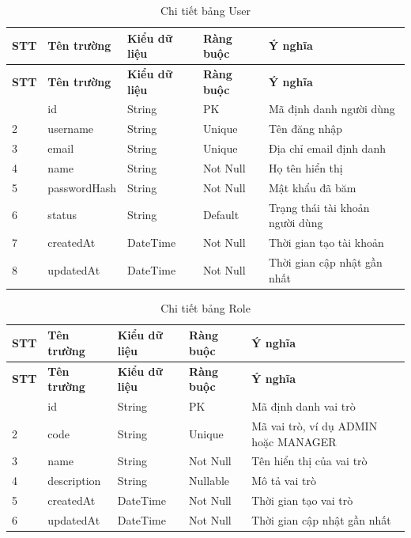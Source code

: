 \begin{longtable}{|p{0.7cm}|p{3.3cm}|p{1.9cm}|p{2.1cm}|p{5.4cm}|}
    \caption{Chi tiết bảng User}
    \label{tab:db_user} \\
    \hline
    \textbf{STT} & \textbf{Tên trường} & \textbf{Kiểu dữ liệu} & \textbf{Ràng buộc} & \textbf{Ý nghĩa} \\
    \hline
    \endfirsthead
    \hline
    \textbf{STT} & \textbf{Tên trường} & \textbf{Kiểu dữ liệu} & \textbf{Ràng buộc} & \textbf{Ý nghĩa} \\
    \hline
    \endhead
    \hline
    \endfoot
    \hline
    \endlastfoot
    1 & id & String & PK & Mã định danh người dùng \\ \hline
    2 & username & String & Unique & Tên đăng nhập \\ \hline
    3 & email & String & Unique & Địa chỉ email định danh \\ \hline
    4 & name & String & Not Null & Họ tên hiển thị \\ \hline
    5 & passwordHash & String & Not Null & Mật khẩu đã băm \\ \hline
    6 & status & String & Default & Trạng thái tài khoản người dùng \\ \hline
    7 & createdAt & DateTime & Not Null & Thời gian tạo tài khoản \\ \hline
    8 & updatedAt & DateTime & Not Null & Thời gian cập nhật gần nhất \\
\end{longtable}

\begin{longtable}{|p{0.7cm}|p{3.3cm}|p{1.9cm}|p{2.1cm}|p{5.4cm}|}
    \caption{Chi tiết bảng Role}
    \label{tab:db_role} \\
    \hline
    \textbf{STT} & \textbf{Tên trường} & \textbf{Kiểu dữ liệu} & \textbf{Ràng buộc} & \textbf{Ý nghĩa} \\
    \hline
    \endfirsthead
    \hline
    \textbf{STT} & \textbf{Tên trường} & \textbf{Kiểu dữ liệu} & \textbf{Ràng buộc} & \textbf{Ý nghĩa} \\
    \hline
    \endhead
    \hline
    \endfoot
    \hline
    \endlastfoot
    1 & id & String & PK & Mã định danh vai trò \\ \hline
    2 & code & String & Unique & Mã vai trò, ví dụ ADMIN hoặc MANAGER \\ \hline
    3 & name & String & Not Null & Tên hiển thị của vai trò \\ \hline
    4 & description & String & Nullable & Mô tả vai trò \\ \hline
    5 & createdAt & DateTime & Not Null & Thời gian tạo vai trò \\ \hline
    6 & updatedAt & DateTime & Not Null & Thời gian cập nhật gần nhất \\
\end{longtable}


